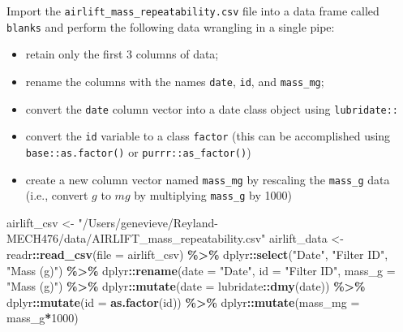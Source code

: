 \documentclass[
]{article}
\newenvironment{Shaded}{\begin{snugshade}}{\end{snugshade}}
\newcommand{\AttributeTok}[1]{\textcolor[rgb]{0.13,0.29,0.53}{#1}}
\newcommand{\DecValTok}[1]{\textcolor[rgb]{0.00,0.00,0.81}{#1}}
\newcommand{\FunctionTok}[1]{\textcolor[rgb]{0.13,0.29,0.53}{\textbf{#1}}}
\newcommand{\NormalTok}[1]{#1}
\newcommand{\OtherTok}[1]{\textcolor[rgb]{0.56,0.35,0.01}{#1}}
\newcommand{\SpecialCharTok}[1]{\textcolor[rgb]{0.81,0.36,0.00}{\textbf{#1}}}
\newcommand{\StringTok}[1]{\textcolor[rgb]{0.31,0.60,0.02}{#1}}
\providecommand{\tightlist}{%
  \setlength{\itemsep}{0pt}\setlength{\parskip}{0pt}}
\begin{document}
Import the \texttt{airlift\_mass\_repeatability.csv} file into a data
frame called \texttt{blanks} and perform the following data wrangling in
a single pipe:

\begin{itemize}
\tightlist
\item
  retain only the first 3 columns of data;
\item
  rename the columns with the names \texttt{date}, \texttt{id}, and
  \texttt{mass\_mg};
\item
  convert the \texttt{date} column vector into a date class object using
  \texttt{lubridate::}
\item
  convert the \texttt{id} variable to a class \texttt{factor} (this can
  be accomplished using \texttt{base::as.factor()} or
  \texttt{purrr::as\_factor()})
\item
  create a new column vector named \texttt{mass\_mg} by rescaling the
  \texttt{mass\_g} data (i.e., convert \(g\) to \(mg\) by multiplying
  \texttt{mass\_g} by 1000)
\end{itemize}

\begin{Shaded}
\begin{Highlighting}[]
\NormalTok{airlift\_csv }\OtherTok{\textless{}{-}} \StringTok{"/Users/genevieve/Reyland{-}MECH476/data/AIRLIFT\_mass\_repeatability.csv"}
\NormalTok{airlift\_data }\OtherTok{\textless{}{-}}\NormalTok{ readr}\SpecialCharTok{::}\FunctionTok{read\_csv}\NormalTok{(}\AttributeTok{file =}\NormalTok{ airlift\_csv) }\SpecialCharTok{\%\textgreater{}\%}
\NormalTok{  dplyr}\SpecialCharTok{::}\FunctionTok{select}\NormalTok{(}\StringTok{"Date"}\NormalTok{, }
                \StringTok{"Filter ID"}\NormalTok{, }
                \StringTok{"Mass (g)"}\NormalTok{) }\SpecialCharTok{\%\textgreater{}\%}
\NormalTok{  dplyr}\SpecialCharTok{::}\FunctionTok{rename}\NormalTok{(}\AttributeTok{date =} \StringTok{"Date"}\NormalTok{, }
                \AttributeTok{id =} \StringTok{"Filter ID"}\NormalTok{, }
                \AttributeTok{mass\_g =} \StringTok{"Mass (g)"}\NormalTok{) }\SpecialCharTok{\%\textgreater{}\%} 
\NormalTok{  dplyr}\SpecialCharTok{::}\FunctionTok{mutate}\NormalTok{(}\AttributeTok{date =}\NormalTok{ lubridate}\SpecialCharTok{::}\FunctionTok{dmy}\NormalTok{(date)) }\SpecialCharTok{\%\textgreater{}\%}
\NormalTok{  dplyr}\SpecialCharTok{::}\FunctionTok{mutate}\NormalTok{(}\AttributeTok{id =} \FunctionTok{as.factor}\NormalTok{(id)) }\SpecialCharTok{\%\textgreater{}\%}
\NormalTok{  dplyr}\SpecialCharTok{::}\FunctionTok{mutate}\NormalTok{(}\AttributeTok{mass\_mg =}\NormalTok{ mass\_g}\SpecialCharTok{*}\DecValTok{1000}\NormalTok{)}
\end{Highlighting}
\end{Shaded}
\end{document}
